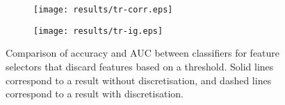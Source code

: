 \begin{figure}[htbp]
\begin{subfigure}{1.1\textwidth}
\texttt{[image: results/tr-corr.eps]}
\caption{}
\label{fig:tr-threshold-corr}
\end{subfigure}

\begin{subfigure}{1.1\textwidth}
\texttt{[image: results/tr-ig.eps]}
\caption{}
\label{fig:tr-threshold-ig}
\end{subfigure}
\caption[]{Comparison of accuracy and AUC between classifiers for feature selectors that discard features based on a threshold. Solid lines correspond to a result without discretisation, and dashed lines correspond to a result with discretisation.}
\label{fig:tr-threshold}
\end{figure}
